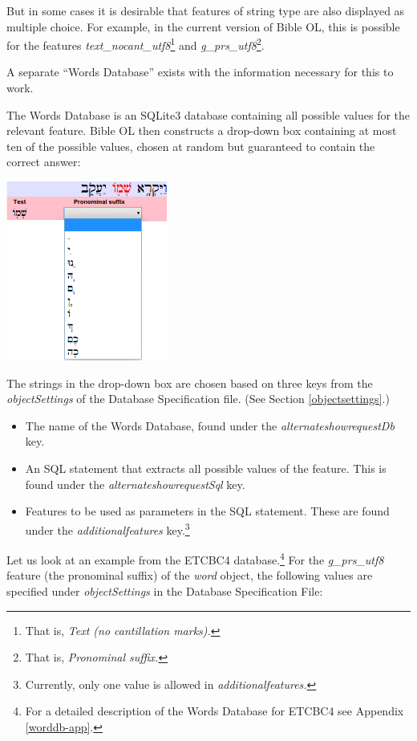 \documentclass[11pt,oneside,a4paper]{memoir}
\begin{document}
But in some cases it is desirable that features of string type are also displayed as multiple
choice. For example, in the current version of Bible OL, this is possible for the features
\emph{text\_nocant\_utf8}\footnote{That is, \emph{Text (no cantillation marks).}} and
\emph{g\_prs\_utf8}\footnote{That is, \emph{Pronominal suffix.}}.

A separate ``Words Database'' exists with the information necessary for this to work.

The Words Database is an SQLite3 database containing all possible values for the relevant feature.
Bible OL then constructs a drop-down box containing at most ten of the possible values, chosen at
random but guaranteed to contain the correct answer:

\begin{center}
  \includegraphics[width=0.4\textwidth]{pronsuf.png}
\end{center}

The strings in the drop-down box are chosen based on three keys from the \emph{objectSettings} of
the Database Specification file. (See Section \ref{objectsettings}.)

\begin{itemize}
\item The name of the Words Database, found under the \emph{alternateshowrequestDb} key.
\item An SQL statement that extracts all possible values of the feature. This is found under the
  \emph{alternateshowrequestSql} key.
\item Features to be used as parameters in the SQL statement. These are found under the
  \emph{additionalfeatures} key.\footnote{Currently, only one value is allowed in \emph{additionalfeatures.}}
\end{itemize}


Let us look at an example from the ETCBC4 database.\footnote{For a detailed description of the Words
Database for ETCBC4 see Appendix \ref{worddb-app}.} For the \emph{g\_prs\_utf8} feature (the
pronominal suffix) of the \emph{word} object, the following values are specified under
\emph{objectSettings} in the Database Specification File:
\end{document}
